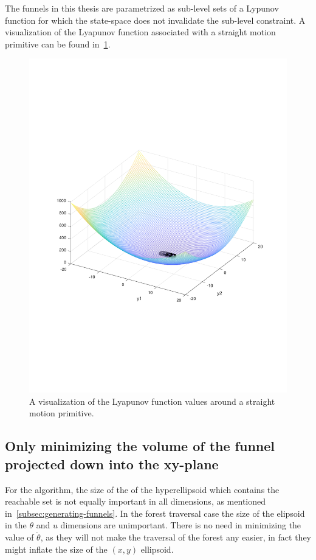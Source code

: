 The funnels in this thesis are parametrized as sub-level sets of a Lypunov
function for which the state-space does not invalidate the sub-level constraint.
A visualization of the Lyapunov function associated with a straight motion
primitive can be found in~\ref{fig:visualized-lyapunov}.
\begin{figure}
  \centering
  \includegraphics[scale=.3]{figures/rrtfunnel/straight-funnel-lyapunov-3d}
  \caption{A visualization of the Lyapunov function values around a straight
    motion primitive.}
  \label{fig:visualized-lyapunov}
\end{figure}

\subsection{Only minimizing the volume of the funnel projected down into the
  xy-plane}
\label{subsec:xy-cost-function}

For the \rrtfunnel{} algorithm, the size of the of the hyperellipsoid which
contains the reachable set is not equally important in all dimensions, as
mentioned in~\ref{subsec:generating-funnels}. In the forest traversal case the
size of the elipsoid in the \(\theta\) and \(u\) dimensions are unimportant.
There is no need in minimizing the value of \(\dot{\theta}\), as they will not
make the traversal of the forest any easier, in fact they might inflate the size
of the \((x,y)\) ellipsoid.

